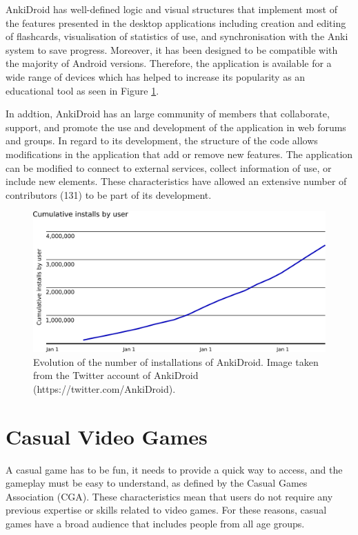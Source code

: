 AnkiDroid has well-defined logic and visual structures \citep{zamora2011ankidroid} that implement most of the features presented in the desktop applications including creation and editing of flashcards, visualisation of statistics of use, and synchronisation with the Anki system to save progress. Moreover, it has been designed to be compatible with the majority of Android versions. Therefore, the application is available for a wide range of devices which has helped to increase its popularity as an educational tool as seen in Figure \ref{fig:anki-evolution}.

In addtion, AnkiDroid has an large community of members that collaborate, support, and promote the use and development of the application in web forums and groups. In regard to its development, the structure of the code allows modifications in the application that add or remove new features. The application can be modified to connect to external services, collect information of use, or include new elements. These characteristics have allowed an extensive number of contributors (131) to be part of its development.

\begin{figure}[htb]
    \vskip 5mm
        \begin{center}
            \includegraphics[scale=0.4]{./Figures/anki_progress.png}
            \caption{Evolution of the number of installations of AnkiDroid. Image taken from the Twitter account of AnkiDroid (https://twitter.com/AnkiDroid).}
            \label{fig:anki-evolution}
        \end{center}
    \vskip -5mm
\end{figure}


\section{Casual Video Games}
A casual game has to be fun, it needs to provide a quick way to access, and the gameplay must be easy to understand, as defined by the Casual Games Association (CGA). These characteristics mean that users do not require any previous expertise or skills related to video games. For these reasons, casual games have a broad audience that includes people from all age groups.

